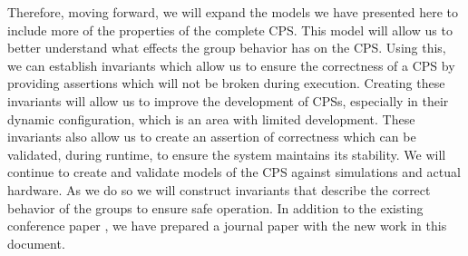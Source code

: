Therefore, moving forward, we will expand the models we have presented here to include more of the properties of the complete CPS. This model will allow us to better understand what effects the group behavior has on the CPS. Using this, we can establish invariants which allow us to ensure the correctness of a CPS by providing assertions which will not be broken during execution. Creating these invariants will allow us to improve the development of CPSs, especially in their dynamic configuration, which is an area with limited development. These invariants also allow us to create an assertion of correctness which can be validated, during runtime, to ensure the system maintains its stability. We will continue to create and validate models of the CPS against simulations and actual hardware. As we do so we will construct invariants that describe the correct behavior of the groups to ensure safe operation. In addition to the existing conference paper \cite{CRITIS2012}, we have prepared a journal paper with the new work in this document. 
